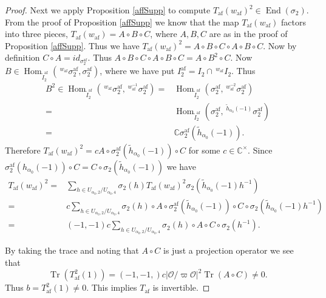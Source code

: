 \documentclass[10pt, letterpaper]{amsart}
\theoremstyle{plain}
\theoremstyle{definition}
\numberwithin{equation}{section}
\newcommand{\htt}{\tilde{h}}
\newcommand{\It}{\widetilde{I}}
\newcommand{\End}{\operatorname{End}}
\newcommand{\Hom}{\operatorname{Hom}}
\newcommand{\Tr}{\operatorname{Tr}}
\newcommand{\af}{\mathrm{af}}
\newcommand{\Ocal}{\mathcal{O}}
\begin{document}
\begin{proof}
        Next we apply Proposition \ref{affSupp} to compute $T_{\af}(w_{\af})^{2}\in\End(\sigma_{2})$. From the proof of Proposition \ref{affSupp} we know that the map $T_{\af}(w_{\af})$ factors into three pieces, $T_{\af}(w_{\af})=A\circ B\circ C$, where $A,B,C$ are as in the proof of Proposition \ref{affSupp}. Thus we have $T_{\af}(w_{\af})^{2}=A\circ B\circ C\circ A\circ B\circ C$. Now by definition $C\circ A = id_{\sigma_{2}^{\af}}$. Thus $A\circ B\circ C\circ A\circ B\circ C=A\circ B^{2}\circ C$. Now $B\in \Hom_{ \It_2^{\af}}(\,^{w_{\af}}\sigma_{2}^{\af},\sigma_{2}^{\af})$, where we have put $I_{2}^{\af}= I_2\cap \,^{w_{\af}} I_2$. Thus 
        \begin{align*}
            B^{2}\in\Hom_{ \It_2^{\af}}(\,^{w_{\af}}\sigma_{2}^{\af},\,^{w_{\af}^{-1}}\sigma_{2}^{\af})=&\Hom_{ \It_2^{\af}}(\sigma_{2}^{\af},\,^{w_{\af}^{-2}}\sigma_{2}^{\af})\\
            =&\Hom_{ \It_2^{\af}}(\sigma_{2}^{\af},\,^{\htt_{\alpha_{0}}(-1)}\sigma_{2}^{\af})\\
            =&\mathbb{C}\sigma_{2}^{\af}(\htt_{\alpha_{0}}(-1)).
        \end{align*}
        Therefore $T_{\af}(w_{\af})^{2} = c A\circ \sigma_{2}^{\af}(\htt_{\alpha_{0}}(-1))\circ C$ for some $c\in\mathbb{C}^{\times}$. Since $\sigma_{2}^{\af}(h_{\alpha_{0}}(-1))\circ C=C\circ \sigma_{2}(\htt_{\alpha_{0}}(-1))$ we have
        \begin{align*}
            T_{\af}(w_{\af})^{2}=&\sum_{h\in U_{\alpha_{0},2}/U_{\alpha_{0},4}}\sigma_{2}(h)T_{\af}(w_{\af})^{2}\sigma_{2}(\htt_{\alpha_{0}}(-1)h^{-1})\\
            =& c\sum_{h\in U_{\alpha_{0},2}/U_{\alpha_{0},4}}\sigma_{2}(h)\circ A\circ \sigma_{2}^{\af}(\htt_{\alpha_{0}}(-1))\circ C\circ\sigma_{2}(\htt_{\alpha_{0}}(-1)h^{-1})\\
            =&(-1,-1)c\sum_{h\in U_{\alpha_{0},2}/U_{\alpha_{0},4}} \sigma_{2}(h)\circ A\circ C\circ\sigma_{2}(h^{-1}).
        \end{align*}

        By taking the trace and noting that $A\circ C$ is just a projection operator we see that 
        \begin{equation*}
            \Tr(T_{\af}^{2}(1))=(-1,-1,)c\left|\Ocal\slash\varpi\Ocal\right|^{2}\Tr(A\circ C)\neq 0.
        \end{equation*}
        Thus $b=T_{\af}^{2}(1)\neq 0$. This implies $T_{\af}$ is invertible.
    \end{proof}
\end{document}
